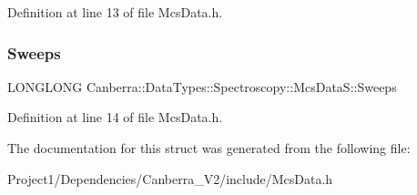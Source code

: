 Definition at line 13 of file Mcs\+Data.\+h.

\mbox{\label{struct_canberra_1_1_data_types_1_1_spectroscopy_1_1_mcs_data_s_a7e4a45274d6a6bb3ecce1e4be6f8e483}} 
\subsubsection{\texorpdfstring{Sweeps}{Sweeps}}
{\footnotesize\ttfamily L\+O\+N\+G\+L\+O\+NG Canberra\+::\+Data\+Types\+::\+Spectroscopy\+::\+Mcs\+Data\+S\+::\+Sweeps}



Definition at line 14 of file Mcs\+Data.\+h.



The documentation for this struct was generated from the following file\+:\begin{DoxyCompactItemize}
\item 
Project1/\+Dependencies/\+Canberra\+\_\+\+V2/include/Mcs\+Data.\+h\end{DoxyCompactItemize}
